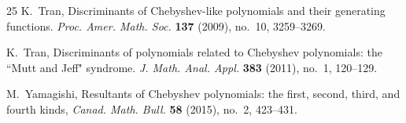 \documentclass{amsart}
\theoremstyle{plain}
\numberwithin{equation}{section}
\begin{document}
\begin{thebibliography}{25}
 K.~Tran, Discriminants of Chebyshev-like polynomials and their
generating functions. {\it Proc. Amer. Math. Soc.} {\bf 137} (2009), no.~10,
3259--3269.

 K.~Tran, Discriminants of polynomials related to Chebyshev
polynomials: the ``Mutt and Jeff" syndrome. {\it J. Math. Anal. Appl.}
{\bf 383} (2011), no.~1, 120--129.

 M.~Yamagishi, Resultants of Chebyshev polynomials: the first, 
second, third, and fourth kinds, {\it Canad. Math. Bull.} {\bf 58} (2015), 
no.~2, 423--431.

\end{thebibliography}
\end{document}
